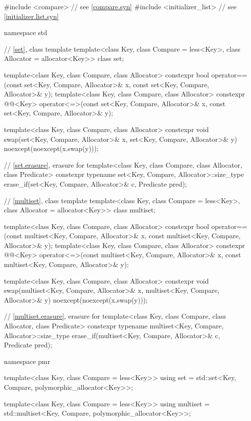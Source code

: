 %
\begin{codeblock}
#include <compare>              // see \ref{compare.syn}
#include <initializer_list>     // see \ref{initializer.list.syn}

namespace std {
  // \ref{set}, class template 
  template<class Key, class Compare = less<Key>, class Allocator = allocator<Key>>
    class set;

  template<class Key, class Compare, class Allocator>
    constexpr bool operator==(const set<Key, Compare, Allocator>& x,
                              const set<Key, Compare, Allocator>& y);
  template<class Key, class Compare, class Allocator>
    constexpr @@<Key>
      operator<=>(const set<Key, Compare, Allocator>& x,
                  const set<Key, Compare, Allocator>& y);

  template<class Key, class Compare, class Allocator>
    constexpr void swap(set<Key, Compare, Allocator>& x,
                        set<Key, Compare, Allocator>& y)
      noexcept(noexcept(x.swap(y)));

  // \ref{set.erasure}, erasure for 
  template<class Key, class Compare, class Allocator, class Predicate>
    constexpr typename set<Key, Compare, Allocator>::size_type
      erase_if(set<Key, Compare, Allocator>& c, Predicate pred);

  // \ref{multiset}, class template 
  template<class Key, class Compare = less<Key>, class Allocator = allocator<Key>>
    class multiset;

  template<class Key, class Compare, class Allocator>
    constexpr bool operator==(const multiset<Key, Compare, Allocator>& x,
                              const multiset<Key, Compare, Allocator>& y);
  template<class Key, class Compare, class Allocator>
    constexpr @@<Key>
      operator<=>(const multiset<Key, Compare, Allocator>& x,
                  const multiset<Key, Compare, Allocator>& y);

  template<class Key, class Compare, class Allocator>
    constexpr void swap(multiset<Key, Compare, Allocator>& x,
                        multiset<Key, Compare, Allocator>& y)
      noexcept(noexcept(x.swap(y)));

  // \ref{multiset.erasure}, erasure for 
  template<class Key, class Compare, class Allocator, class Predicate>
    constexpr typename multiset<Key, Compare, Allocator>::size_type
      erase_if(multiset<Key, Compare, Allocator>& c, Predicate pred);

  namespace pmr {
    template<class Key, class Compare = less<Key>>
      using set = std::set<Key, Compare, polymorphic_allocator<Key>>;

    template<class Key, class Compare = less<Key>>
      using multiset = std::multiset<Key, Compare, polymorphic_allocator<Key>>;
  }
}
\end{codeblock}

